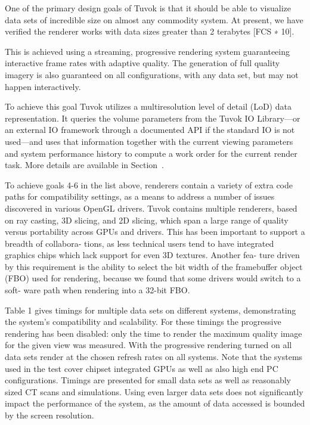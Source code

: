 One of the primary design goals of Tuvok is that it should be
able to visualize data sets of incredible size on almost any
commodity system. At present, we have verified the renderer
works with data sizes greater than 2 terabytes [FCS ∗ 10].

This is achieved using a streaming, progressive rendering
system guaranteeing interactive frame rates with adaptive
quality. The generation of full quality imagery is also
guaranteed on all configurations, with any data set, but may not
happen interactively.

To achieve this goal Tuvok utilizes a multiresolution level
of detail (LoD) data representation. It queries the volume
parameters from the Tuvok IO Library---or an external IO
framework through a documented API if the standard IO is
not used---and uses that information together with the
current viewing parameters and system performance history to
compute a work order for the current render task. More
details are available in Section~.

To achieve goals 4-6 in the list above, renderers contain
a variety of extra code paths for compatibility settings, as a
means to address a number of issues discovered in various
OpenGL drivers. Tuvok contains multiple renderers, based
on ray casting, 3D slicing, and 2D slicing, which span a large
range of quality versus portability across GPUs and drivers.
This has been important to support a breadth of collabora-
tions, as less technical users tend to have integrated graphics
chips which lack support for even 3D textures. Another fea-
ture driven by this requirement is the ability to select the bit
width of the framebuffer object (FBO) used for rendering,
because we found that some drivers would switch to a soft-
ware path when rendering into a 32-bit FBO.

Table 1 gives timings for multiple data sets on different
systems, demonstrating the system's compatibility and scalability.
For these timings the progressive rendering has been
disabled: only the time to render the maximum quality
image for the given view was measured. With the progressive
rendering turned on all data sets render at the chosen refresh
rates on all systems. Note that the systems used in the test
cover chipset integrated GPUs as well as also high end PC
configurations. Timings are presented for small data sets as
well as reasonably sized CT scans and simulations. Using
even larger data sets does not significantly impact the
performance of the system, as the amount of data accessed is
bounded by the screen resolution.

